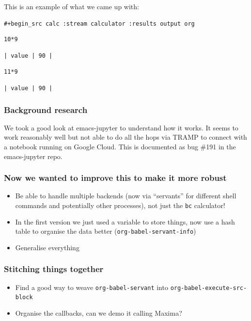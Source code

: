 \documentclass[11pt]{article}
\begin{document}
This is an example of what we came up with:

\texttt{\#+begin\_src calc :stream calculator :results output org}

\begin{verbatim}
10*9
\end{verbatim}

\begin{verbatim}
| value | 90 |
\end{verbatim}

\begin{verbatim}
11*9
\end{verbatim}

\begin{verbatim}
| value | 90 |
\end{verbatim}

\subsubsection{Background research}
\label{sec:orgaf236f8}

We took a good look at emacs-jupyter to understand how it works.
It seems to work reasonably well but not able to do all the hops via TRAMP to connect with a notebook running on Google Cloud.  This is documented as bug \#191 in the emacs-jupyter repo.

\subsubsection{Now we wanted to improve this to make it more robust}
\label{sec:orgfebf387}

\begin{itemize}
\item Be able to handle multiple backends (now via ``servants'' for different shell commands and potentially other processes), not just the \texttt{bc} calculator!
\item In the first version we just used a variable to store things, now use a hash table to organise the data better (\texttt{org-babel-servant-info})
\item Generalise everything
\end{itemize}

\subsubsection{Stitching things together}
\label{sec:org289bff6}

\begin{itemize}
\item Find a good way to weave \texttt{org-babel-servant} into \texttt{org-babel-execute-src-block}
\item Organise the callbacks, can we demo it calling Maxima?
\end{itemize}
\end{document}
